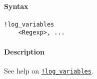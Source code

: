 


	\paragraph{Syntax}

\begin{verbatim}
!log_variables
    <Regexp>, ...
\end{verbatim}

\paragraph{Description}

See help on \href{modellang/logvariables}{\texttt{!log\_variables}}.


